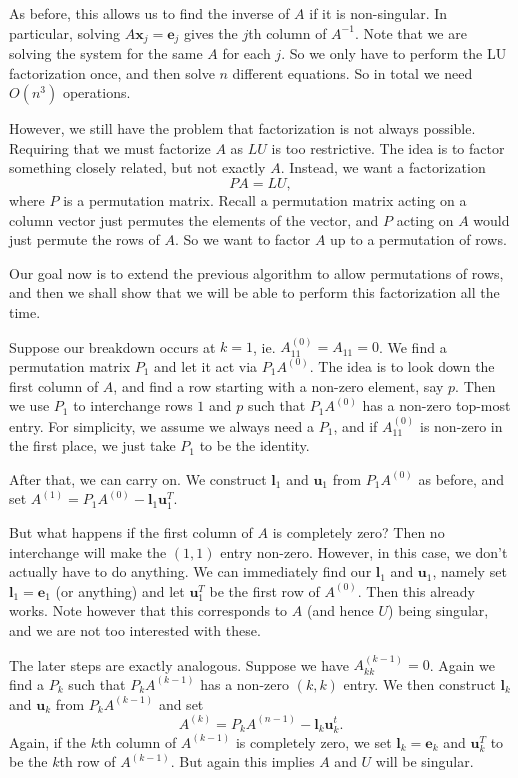 \documentclass[a4paper]{article}
\begin{document}
As before, this allows us to find the inverse of $A$ if it is non-singular. In particular, solving $A\mathbf{x}_j = \mathbf{e}_j$ gives the $j$th column of $A^{-1}$. Note that we are solving the system for the same $A$ for each $j$. So we only have to perform the LU factorization once, and then solve $n$ different equations. So in total we need $O(n^3)$ operations.

However, we still have the problem that factorization is not always possible. Requiring that we must factorize $A$ as $LU$ is too restrictive. The idea is to factor something closely related, but not exactly $A$. Instead, we want a factorization
\[
  PA = LU,
\]
where $P$ is a permutation matrix. Recall a permutation matrix acting on a column vector just permutes the elements of the vector, and $P$ acting on $A$ would just permute the rows of $A$. So we want to factor $A$ up to a permutation of rows.

Our goal now is to extend the previous algorithm to allow permutations of rows, and then we shall show that we will be able to perform this factorization all the time.

Suppose our breakdown occurs at $k = 1$, ie. $A_{11}^{(0)} = A_{11} = 0$. We find a permutation matrix $P_1$ and let it act via $P_1A^{(0)}$. The idea is to look down the first column of $A$, and find a row starting with a non-zero element, say $p$. Then we use $P_1$ to interchange rows $1$ and $p$ such that $P_1A^{(0)}$ has a non-zero top-most entry. For simplicity, we assume we always need a $P_1$, and if $A_{11}^{(0)}$ is non-zero in the first place, we just take $P_1$ to be the identity.

After that, we can carry on. We construct $\mathbf{l}_1$ and $\mathbf{u}_1$ from $P_1A^{(0)}$ as before, and set $A^{(1)} = P_1A^{(0)} - \mathbf{l}_1 \mathbf{u}_1^T$.

But what happens if the first column of $A$ is completely zero? Then no interchange will make the $(1, 1)$ entry non-zero. However, in this case, we don't actually have to do anything. We can immediately find our $\mathbf{l}_1$ and $\mathbf{u}_1$, namely set $\mathbf{l}_1 = \mathbf{e}_1$ (or anything) and let $\mathbf{u}_1^T$ be the first row of $A^{(0)}$. Then this already works. Note however that this corresponds to $A$ (and hence $U$) being singular, and we are not too interested with these.

The later steps are exactly analogous. Suppose we have $A_{kk}^{(k - 1)} = 0$. Again we find a $P_k$ such that $P_k A^{(k - 1)}$ has a non-zero $(k, k)$ entry. We then construct $\mathbf{l}_k$ and $\mathbf{u}_k$ from $P_k A^{(k - 1)}$ and set
\[
  A^{(k)} = P_k A^{(n - 1)} - \mathbf{l}_k \mathbf{u}_k^t.
\]
Again, if the $k$th column of $A^{(k - 1)}$ is completely zero, we set $\mathbf{l}_k = \mathbf{e}_k$ and $\mathbf{u}_k^T$ to be the $k$th row of $A^{(k - 1)}$. But again this implies $A$ and $U$ will be singular.
\end{document}
